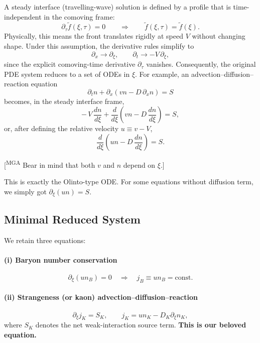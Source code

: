 \documentclass[11pt]{article}
\newcommand{\mgacom}[1]{\textsf{\color[rgb]{0.6,0,0}[\textsuperscript{MGA} #1]}}
\begin{document}
A steady interface (travelling-wave) solution is defined by a profile that is
time-independent in the comoving frame:
\begin{equation}
\partial_\tau \tilde f(\xi,\tau)=0
\qquad \Rightarrow \qquad
\tilde f(\xi,\tau)=\tilde f(\xi).
\end{equation}
Physically, this means the front translates rigidly at speed $V$ without
changing shape. Under this assumption, the derivative rules simplify to
\begin{equation}
\boxed{
\partial_x \to \partial_\xi,
\qquad
\partial_t \to -V\,\partial_\xi,
}
\end{equation}
since the explicit comoving-time derivative $\partial_\tau$ vanishes.
Consequently, the original PDE system reduces to a set of ODEs in $\xi$.
For example, an advection--diffusion--reaction equation
\begin{equation}
\partial_t n + \partial_x\!\left(v n - D\,\partial_x n\right)=S
\end{equation}
becomes, in the steady interface frame,
\begin{equation}
-\,V\,\frac{dn}{d\xi}
+
\frac{d}{d\xi}\!\left(v n - D\,\frac{dn}{d\xi}\right)
=
S,
\end{equation}
or, after defining the relative velocity $u\equiv v-V$,
\begin{equation}
\frac{d}{d\xi}\!\left(u n - D\,\frac{dn}{d\xi}\right)=S.
\end{equation}

\mgacom{Bear in mind that both $v$ and $n$ depend on $\xi$.}

This is exactly the Olinto-type ODE. For some equations without diffusion term, we simply got $\partial_\xi (un) = S$.

\subsection*{Minimal Reduced System}

We retain three equations:

\paragraph{(i) Baryon number conservation}
\begin{equation}
\partial_\xi (u n_B) = 0
\quad \Rightarrow \quad
j_B \equiv u n_B = \text{const}.
\end{equation}

\paragraph{(ii) Strangeness (or kaon) advection--diffusion--reaction}
\begin{equation}
\partial_\xi j_K = S_K,
\qquad
j_K = u n_K - D_K \partial_\xi n_K,
\end{equation}
where $S_K$ denotes the net weak-interaction source term. \textbf{This is our beloved equation.}
\end{document}
